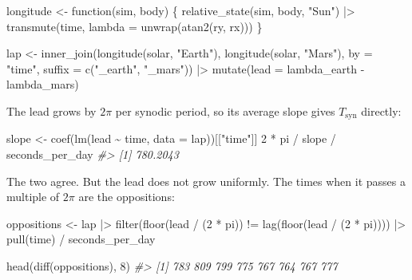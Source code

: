\documentclass[
  10.5pt,
  letterpaper,
]{scrbook}
\newenvironment{Shaded}{\begin{snugshade}}{\end{snugshade}}
\newcommand{\AttributeTok}[1]{\textcolor[rgb]{0.00,0.00,0.00}{#1}}
\newcommand{\CommentTok}[1]{\textcolor[rgb]{0.00,0.00,0.00}{\textit{#1}}}
\newcommand{\ControlFlowTok}[1]{\textcolor[rgb]{0.00,0.00,0.00}{#1}}
\newcommand{\DecValTok}[1]{\textcolor[rgb]{0.00,0.00,0.00}{#1}}
\newcommand{\FunctionTok}[1]{\textcolor[rgb]{0.00,0.00,0.00}{#1}}
\newcommand{\NormalTok}[1]{\textcolor[rgb]{0.00,0.00,0.00}{#1}}
\newcommand{\OtherTok}[1]{\textcolor[rgb]{0.00,0.00,0.00}{#1}}
\newcommand{\SpecialCharTok}[1]{\textcolor[rgb]{0.00,0.00,0.00}{#1}}
\newcommand{\StringTok}[1]{\textcolor[rgb]{0.00,0.00,0.00}{#1}}
\theoremstyle{definition}
\theoremstyle{plain}
\theoremstyle{remark}
\begin{document}
\begin{Shaded}
\begin{Highlighting}[]
\NormalTok{longitude }\OtherTok{\textless{}{-}} \ControlFlowTok{function}\NormalTok{(sim, body) \{}
  \FunctionTok{relative\_state}\NormalTok{(sim, body, }\StringTok{"Sun"}\NormalTok{) }\SpecialCharTok{|\textgreater{}}
    \FunctionTok{transmute}\NormalTok{(time, }\AttributeTok{lambda =} \FunctionTok{unwrap}\NormalTok{(}\FunctionTok{atan2}\NormalTok{(ry, rx)))}
\NormalTok{\}}

\NormalTok{lap }\OtherTok{\textless{}{-}} \FunctionTok{inner\_join}\NormalTok{(}\FunctionTok{longitude}\NormalTok{(solar, }\StringTok{"Earth"}\NormalTok{), }\FunctionTok{longitude}\NormalTok{(solar, }\StringTok{"Mars"}\NormalTok{),}
                  \AttributeTok{by =} \StringTok{"time"}\NormalTok{, }\AttributeTok{suffix =} \FunctionTok{c}\NormalTok{(}\StringTok{"\_earth"}\NormalTok{, }\StringTok{"\_mars"}\NormalTok{)) }\SpecialCharTok{|\textgreater{}}
  \FunctionTok{mutate}\NormalTok{(}\AttributeTok{lead =}\NormalTok{ lambda\_earth }\SpecialCharTok{{-}}\NormalTok{ lambda\_mars)}
\end{Highlighting}
\end{Shaded}

The lead grows by \(2\pi\) per synodic period, so its average slope
gives \(T_{\mathrm{syn}}\) directly:

\begin{Shaded}
\begin{Highlighting}[]
\NormalTok{slope }\OtherTok{\textless{}{-}} \FunctionTok{coef}\NormalTok{(}\FunctionTok{lm}\NormalTok{(lead }\SpecialCharTok{\textasciitilde{}}\NormalTok{ time, }\AttributeTok{data =}\NormalTok{ lap))[[}\StringTok{"time"}\NormalTok{]]}
\DecValTok{2} \SpecialCharTok{*}\NormalTok{ pi }\SpecialCharTok{/}\NormalTok{ slope }\SpecialCharTok{/}\NormalTok{ seconds\_per\_day}
\CommentTok{\#\textgreater{} [1] 780.2043}
\end{Highlighting}
\end{Shaded}

The two agree. But the lead does not grow uniformly. The times when it
passes a multiple of \(2\pi\) are the oppositions:

\begin{Shaded}
\begin{Highlighting}[]
\NormalTok{oppositions }\OtherTok{\textless{}{-}}\NormalTok{ lap }\SpecialCharTok{|\textgreater{}}
  \FunctionTok{filter}\NormalTok{(}\FunctionTok{floor}\NormalTok{(lead }\SpecialCharTok{/}\NormalTok{ (}\DecValTok{2} \SpecialCharTok{*}\NormalTok{ pi)) }\SpecialCharTok{!=} \FunctionTok{lag}\NormalTok{(}\FunctionTok{floor}\NormalTok{(lead }\SpecialCharTok{/}\NormalTok{ (}\DecValTok{2} \SpecialCharTok{*}\NormalTok{ pi)))) }\SpecialCharTok{|\textgreater{}}
  \FunctionTok{pull}\NormalTok{(time) }\SpecialCharTok{/}\NormalTok{ seconds\_per\_day}

\FunctionTok{head}\NormalTok{(}\FunctionTok{diff}\NormalTok{(oppositions), }\DecValTok{8}\NormalTok{)}
\CommentTok{\#\textgreater{} [1] 783 809 799 775 767 764 767 777}
\end{Highlighting}
\end{Shaded}
\end{document}
